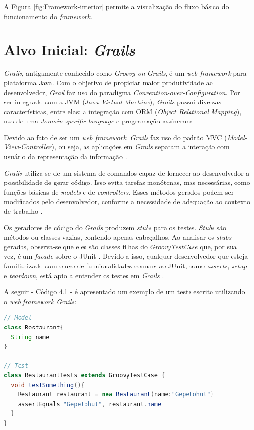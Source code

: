  \par
 \indent A Figura \ref{fig:Framework-interior} permite a visualização do fluxo
 básico do funcionamento do \textit{framework}.

\section{Alvo Inicial: \textit{Grails}}
\textit{Grails}, antigamente conhecido como \textit{Groovy on Grails}, é um
\textit{web framework} para plataforma Java. Com o objetivo de propiciar maior
produtividade ao desenvolvedor, \textit{Grail} faz uso do paradigma
\textit{Convention-over-Configuration}.  Por ser integrado com a JVM
(\textit{Java Virtual Machine}), \textit{Grails} possui diversas características,
entre elas: a integração com ORM (\textit{Object Relational Mapping}), uso de
uma \textit{domain-specific-language} e programação assíncrona \cite{grails2015}.
\par
\indent Devido ao fato de ser um \textit{web framework}, \textit{Grails} faz uso
do padrão MVC (\textit{Model-View-Controller}), ou seja, as aplicações em
\textit{Grails} separam a interação com usuário da representação da informação
\cite{grails2015}.
\par
\indent \textit{Grails} utiliza-se de um sistema de comandos capaz de fornecer
ao desenvolvedor a possibilidade de gerar código. Isso evita tarefas monótonas,
mas necessárias, como funções básicas de \textit{models} e de \textit{controllers}.
Esses métodos gerados podem ser modificados pelo desenvolvedor, conforme a
necessidade de adequação ao contexto de trabalho  \cite{grails2015}.
\par
\indent Os geradores de código do \textit{Grails} produzem  \textit{stubs} para os testes.
\textit{Stubs} são métodos ou classes vazias, contendo apenas cabeçalhos. Ao
analisar os \textit{stubs} gerados, observa-se que eles são classes filhas do
\textit{GroovyTestCase} que, por sua vez, é um \textit{facade} sobre o JUnit
\cite{broughton2010}. Devido a isso, qualquer desenvolvedor que esteja familiarizado
com o uso de funcionalidades comuns ao JUnit, como \textit{asserts}, \textit{setup}
e \textit{teardown}, está apto a entender os testes em \textit{Grails}
\cite{broughton2010}.
\par
\indent A seguir - Código 4.1 - é apresentado um exemplo de um teste escrito
utilizando o \textit{web framework Grails}:

\begin{lstlisting}[language=java, label=exTesteGrails, caption={Exemplo de Teste em \textit{Grails}}]
// Model
class Restaurant{
  String name
}

// Test
class RestaurantTests extends GroovyTestCase {
  void testSomething(){
    Restaurant restaurant = new Restaurant(name:"Gepetohut")
    assertEquals "Gepetohut", restaurant.name
  }
}
\end{lstlisting}

